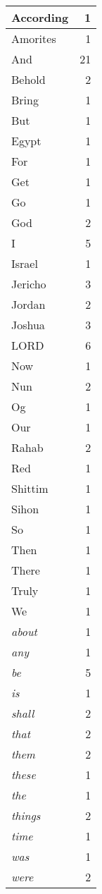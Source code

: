 \begin{center}
\begin{longtable}{l|r}
\hline \hline
\endlastfoot
According & 1 \\ \hline
Amorites & 1 \\ \hline
And & 21 \\ \hline
Behold & 2 \\ \hline
Bring & 1 \\ \hline
But & 1 \\ \hline
Egypt & 1 \\ \hline
For & 1 \\ \hline
Get & 1 \\ \hline
Go & 1 \\ \hline
God & 2 \\ \hline
I & 5 \\ \hline
Israel & 1 \\ \hline
Jericho & 3 \\ \hline
Jordan & 2 \\ \hline
Joshua & 3 \\ \hline
LORD & 6 \\ \hline
Now & 1 \\ \hline
Nun & 2 \\ \hline
Og & 1 \\ \hline
Our & 1 \\ \hline
Rahab & 2 \\ \hline
Red & 1 \\ \hline
Shittim & 1 \\ \hline
Sihon & 1 \\ \hline
So & 1 \\ \hline
Then & 1 \\ \hline
There & 1 \\ \hline
Truly & 1 \\ \hline
We & 1 \\ \hline
\emph{about} & 1 \\ \hline
\emph{any} & 1 \\ \hline
\emph{be} & 5 \\ \hline
\emph{is} & 1 \\ \hline
\emph{shall} & 2 \\ \hline
\emph{that} & 2 \\ \hline
\emph{them} & 2 \\ \hline
\emph{these} & 1 \\ \hline
\emph{the} & 1 \\ \hline
\emph{things} & 2 \\ \hline
\emph{time} & 1 \\ \hline
\emph{was} & 1 \\ \hline
\emph{were} & 2 \\ \hline

\end{longtable}
\end{center}
